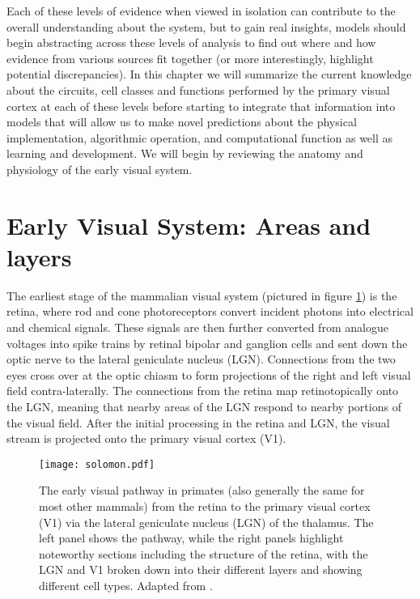 Each of these levels of evidence when viewed in isolation can
contribute to the overall understanding about the system, but to gain
real insights, models should begin abstracting across these levels of
analysis to find out where and how evidence from various sources fit
together (or more interestingly, highlight potential
discrepancies). In this chapter we will summarize the current
knowledge about the circuits, cell classes and functions performed by
the primary visual cortex at each of these levels before starting to
integrate that information into models that will allow us to make
novel predictions about the physical implementation, algorithmic
operation, and computational function as well as learning and
development.  We will begin by reviewing the anatomy and physiology of
the early visual system.

\section{Early Visual System: Areas and layers}

The earliest stage of the mammalian visual system (pictured in figure
\ref{VisualSystem}) is the retina, where rod and cone
photoreceptors convert incident photons into electrical and chemical
signals. These signals are then further converted from analogue
voltages into spike trains by retinal bipolar and ganglion cells and
sent down the optic nerve to the lateral geniculate nucleus
(LGN). Connections from the two eyes cross over at the optic chiasm to
form projections of the right and left visual field
contra-laterally. The connections from the retina map retinotopically
onto the LGN, meaning that nearby areas of the LGN respond to nearby
portions of the visual field. After the initial processing in the
retina and LGN, the visual stream is projected onto the primary visual
cortex (V1).

\begin{figure}
	\centering
        \texttt{[image: solomon.pdf]}
	\caption[A diagram of the early visual pathway in mammals, reproduced
      from \cite{Solomon2007}.]{The early visual pathway in primates
      (also generally the same for most other mammals) from
      the retina to the primary visual cortex (V1) via the lateral
      geniculate nucleus (LGN) of the thalamus. The left panel shows
      the pathway, while the right panels highlight noteworthy
      sections including the structure of the retina, with the LGN and V1
      broken down into their different layers and showing different
      cell types. Adapted from \cite{Solomon2007}.}
	\label{VisualSystem}
\end{figure}

